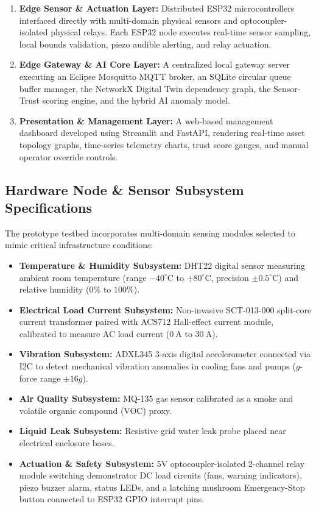 \documentclass[conference]{IEEEtran}
\begin{document}
\begin{enumerate}
    \item \textbf{Edge Sensor \& Actuation Layer:} Distributed ESP32 microcontrollers interfaced directly with multi-domain physical sensors and optocoupler-isolated physical relays. Each ESP32 node executes real-time sensor sampling, local bounds validation, piezo audible alerting, and relay actuation.
    \item \textbf{Edge Gateway \& AI Core Layer:} A centralized local gateway server executing an Eclipse Mosquitto MQTT broker, an SQLite circular queue buffer manager, the NetworkX Digital Twin dependency graph, the Sensor-Trust scoring engine, and the hybrid AI anomaly model.
    \item \textbf{Presentation \& Management Layer:} A web-based management dashboard developed using Streamlit and FastAPI, rendering real-time asset topology graphs, time-series telemetry charts, trust score gauges, and manual operator override controls.
\end{enumerate}

\subsection{Hardware Node \& Sensor Subsystem Specifications}
The prototype testbed incorporates multi-domain sensing modules selected to mimic critical infrastructure conditions:
\begin{itemize}
    \item \textbf{Temperature \& Humidity Subsystem:} DHT22 digital sensor measuring ambient room temperature (range $-40^\circ\text{C}$ to $+80^\circ\text{C}$, precision $\pm 0.5^\circ\text{C}$) and relative humidity ($0\%$ to $100\%$).
    \item \textbf{Electrical Load Current Subsystem:} Non-invasive SCT-013-000 split-core current transformer paired with ACS712 Hall-effect current module, calibrated to measure AC load current ($0~\text{A}$ to $30~\text{A}$).
    \item \textbf{Vibration Subsystem:} ADXL345 3-axis digital accelerometer connected via I2C to detect mechanical vibration anomalies in cooling fans and pumps ($g$-force range $\pm 16g$).
    \item \textbf{Air Quality Subsystem:} MQ-135 gas sensor calibrated as a smoke and volatile organic compound (VOC) proxy.
    \item \textbf{Liquid Leak Subsystem:} Resistive grid water leak probe placed near electrical enclosure bases.
    \item \textbf{Actuation \& Safety Subsystem:} 5V optocoupler-isolated 2-channel relay module switching demonstrator DC load circuits (fans, warning indicators), piezo buzzer alarm, status LEDs, and a latching mushroom Emergency-Stop button connected to ESP32 GPIO interrupt pins.
\end{itemize}
\end{document}
